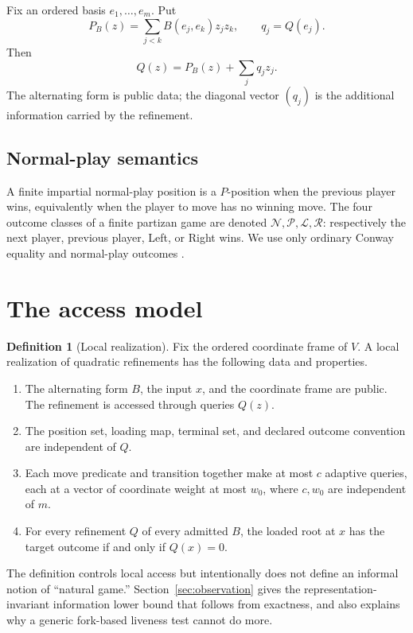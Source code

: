 \documentclass[11pt]{article}
\theoremstyle{definition}
\newtheorem{definition}[theorem]{Definition}
\theoremstyle{remark}
\begin{document}
Fix an ordered basis $e_1,\dots,e_m$.  Put
\[
 P_B(z)=\sum_{j<k}B(e_j,e_k)z_jz_k,
 \qquad q_j=Q(e_j).
\]
Then
\[
  Q(z)=P_B(z)+\sum_j q_jz_j.
\]
The alternating form is public data; the diagonal vector $(q_j)$ is the
additional information carried by the refinement.

\subsection{Normal-play semantics}

A finite impartial normal-play position is a $P$-position when the previous
player wins, equivalently when the player to move has no winning move.  The
four outcome classes of a finite partizan game are denoted
$\mathcal N,\mathcal P,\mathcal L,\mathcal R$: respectively the next player,
previous player, Left, or Right wins.  We use only ordinary Conway equality
and normal-play outcomes \cite{conway1976,berlekampconwayguy1982}.

\section{The access model}\label{sec:access}

\begin{definition}[Local realization]\label{def:local}
Fix the ordered coordinate frame of $V$.  A local realization of quadratic
refinements has the following data and properties.
\begin{enumerate}
\item The alternating form $B$, the input $x$, and the coordinate frame are
      public.  The refinement is accessed through queries $Q(z)$.
\item The position set, loading map, terminal set, and declared outcome
      convention are independent of $Q$.
\item Each move predicate and transition together make at most $c$ adaptive
      queries, each at a vector of coordinate weight at most $w_0$, where
      $c,w_0$ are independent of $m$.
\item For every refinement $Q$ of every admitted $B$, the loaded root at $x$
      has the target outcome if and only if $Q(x)=0$.
\end{enumerate}
\end{definition}

The definition controls local access but intentionally does not define an
informal notion of ``natural game.''  Section~\ref{sec:observation} gives the
representation-invariant information lower bound that follows from exactness,
and also explains why a generic fork-based liveness test cannot do more.
\end{document}
